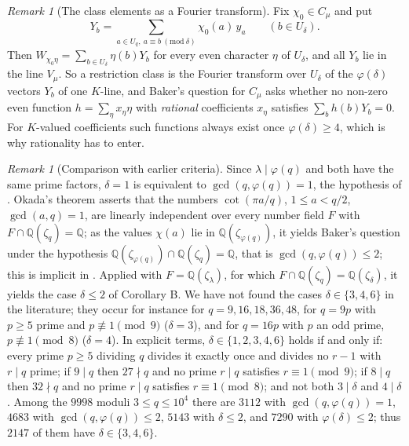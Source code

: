 \documentclass[11pt]{amsart}
\theoremstyle{definition}
\theoremstyle{remark}
\newtheorem{remark}[theorem]{Remark}
\providecommand{\Q}{\mathbb Q}
\numberwithin{equation}{section}
\begin{document}
\begin{remark}[The class elements as a Fourier transform]\label{rem:fourier}
Fix $\chi_0\in C_\mu$ and put
\[
Y_b=\sum_{a\in U_q,\ a\equiv b\ (\mathrm{mod}\ \delta)}\chi_0(a)\,y_a\qquad(b\in U_\delta).
\]
Then $W_{\chi_0\eta}=\sum_{b\in U_\delta}\eta(b)Y_b$ for every even character $\eta$ of $U_\delta$, and all $Y_b$ lie in the line $V_\mu$.
So a restriction class is the Fourier transform over $U_\delta$ of the $\varphi(\delta)$ vectors $Y_b$ of one $K$-line, and Baker's question for $C_\mu$ asks whether no non-zero even function $h=\sum_\eta x_\eta\eta$ with \emph{rational} coefficients $x_\eta$ satisfies $\sum_bh(b)Y_b=0$.
For $K$-valued coefficients such functions always exist once $\varphi(\delta)\ge4$, which is why rationality has to enter.
\end{remark}

\begin{remark}[Comparison with earlier criteria]\label{rem:compare}
Since $\lambda\mid\varphi(q)$ and both have the same prime factors, $\delta=1$ is equivalent to $\gcd(q,\varphi(q))=1$, the hypothesis of \cite{BBW73}.
Okada's theorem \cite{Oka80} asserts that the numbers $\cot(\pi a/q)$, $1\le a<q/2$, $\gcd(a,q)=1$, are linearly independent over every number field $F$ with $F\cap\Q(\zeta_q)=\Q$; as the values $\chi(a)$ lie in $\Q(\zeta_{\varphi(q)})$, it yields Baker's question under the hypothesis $\Q(\zeta_{\varphi(q)})\cap\Q(\zeta_q)=\Q$, that is $\gcd(q,\varphi(q))\le2$; this is implicit in \cite[Theorem~2]{GK22}.
Applied with $F=\Q(\zeta_\lambda)$, for which $F\cap\Q(\zeta_q)=\Q(\zeta_\delta)$, it yields the case $\delta\le2$ of Corollary B.
We have not found the cases $\delta\in\{3,4,6\}$ in the literature; they occur for instance for $q=9,16,18,36,48$, for $q=9p$ with $p\ge5$ prime and $p\not\equiv1\pmod 9$ ($\delta=3$), and for $q=16p$ with $p$ an odd prime, $p\not\equiv1\pmod8$ ($\delta=4$).
In explicit terms, $\delta\in\{1,2,3,4,6\}$ holds if and only if: every prime $p\ge5$ dividing $q$ divides it exactly once and divides no $r-1$ with $r\mid q$ prime; if $9\mid q$ then $27\nmid q$ and no prime $r\mid q$ satisfies $r\equiv1\pmod9$; if $8\mid q$ then $32\nmid q$ and no prime $r\mid q$ satisfies $r\equiv1\pmod 8$; and not both $3\mid\delta$ and $4\mid\delta$.
Among the $9998$ moduli $3\le q\le10^4$ there are $3112$ with $\gcd(q,\varphi(q))=1$, $4683$ with $\gcd(q,\varphi(q))\le2$, $5143$ with $\delta\le2$, and $7290$ with $\varphi(\delta)\le2$; thus $2147$ of them have $\delta\in\{3,4,6\}$.
\end{remark}
\end{document}
